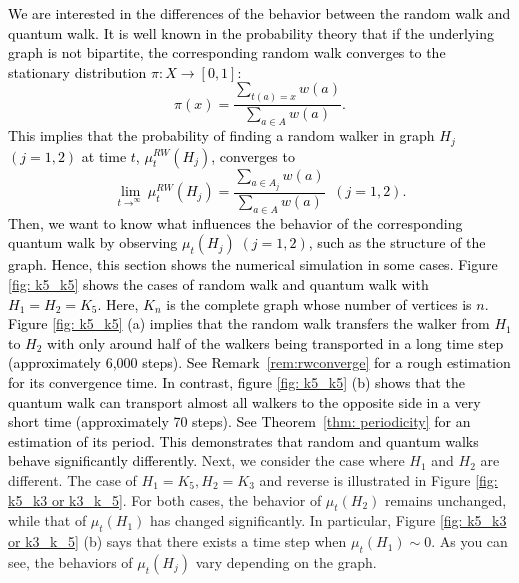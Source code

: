 \documentclass[12pt]{article}
\numberwithin{lemma}{section}
\numberwithin{proposition}{section}
\numberwithin{remark}{section}
\numberwithin{definition}{section}
\newcommand{\red}{\textcolor{black}}
\newcommand{\blue}{\textcolor{blue}}
\begin{document}
\red{
We are interested in the differences of the behavior between the random walk and quantum walk. 
It is well known in the probability theory that if the underlying graph is not bipartite, the corresponding random walk converges to the stationary distribution $\pi:X\to [0,1]$:  
\[ \pi(x)=\frac{\sum_{t(a)=x}w(a)}{\sum_{a\in A}w(a)}. \]
\red{This implies that the probability of finding a random walker in graph $H_j$ $(j=1,2)$ at time $t$, $\mu_t^{RW}(H_j)$, converges to 
\[ \lim_{t\to^\infty}\mu_t^{RW}(H_j)=\frac{\sum_{a\in A_j}w(a)}{\sum_{a\in A}w(a)}\;\;(j=1,2).  \]
}  
Then, we want to know what influences the behavior of the corresponding quantum walk by observing  $\mu_t(H_j)\; (j=1,2)$, such as the structure of the graph.
Hence, this section shows the numerical simulation in some cases.
Figure \ref{fig: k5_k5} shows the cases of random walk and quantum walk with $H_1=H_2=K_5$. Here, $K_{n}$ is the complete graph whose number of vertices is $n$. 
Figure \ref{fig: k5_k5} (a) implies that the random walk transfers the walker from $H_{1}$ to $H_{2}$ with only around half of the walkers being transported in a long time step (approximately 6,000 steps). See Remark~\ref{rem:rwconverge} for a rough estimation for its convergence time.  
In contrast, figure \ref{fig: k5_k5} (b) shows that the quantum walk can transport almost all walkers to the opposite side in a very short time (approximately 70 steps). See Theorem~\ref{thm: periodicity} for an estimation of its period. This demonstrates that random and quantum walks behave significantly differently.
}
Next, we consider the case where $H_1$ and $H_2$ are different.
The case of $H_1=K_5, H_2=K_3$ and reverse is illustrated in Figure \ref{fig: k5_k3 or k3_k_5}.
For both cases, the behavior of $\mu_t(H_2)$ remains unchanged, while that of $\mu_t(H_1)$ has changed significantly.
In particular, Figure \ref{fig: k5_k3 or k3_k_5} (b) says that there exists a time step when $\mu_t(H_1)\sim 0$.
As you can see, the behaviors of $\mu_t(H_j)$ vary depending on the graph.
\end{document}
